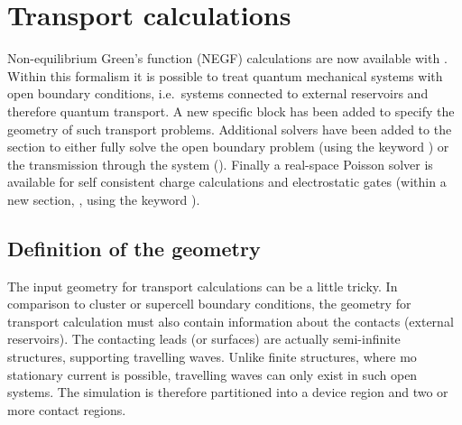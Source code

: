 \chapter{Transport calculations}
\label{app:transp}

Non-equilibrium Green's function (NEGF) calculations are now available with
{\dftbp}. Within this formalism it is possible to treat quantum mechanical
systems with open boundary conditions, i.e.\ systems connected to external
reservoirs and therefore quantum transport.  A new specific 
block has been added to specify the geometry of such transport problems.
Additional solvers have been added to the  section to either
fully solve the open boundary problem (using the keyword )
or the transmission through the system (). Finally a
real-space Poisson solver is available for self consistent charge calculations
and electrostatic gates (within a new section, , using the
keyword ).

\section{Definition of the geometry}
\label{sec:transport.geometry}

The input geometry for transport calculations can be a little tricky. In
comparison to cluster or supercell boundary conditions, the geometry for
transport calculation must also contain information about the contacts (external
reservoirs). The contacting leads (or surfaces) are actually semi-infinite
structures, supporting travelling waves. Unlike finite structures, where mo
stationary current is possible, travelling waves can only exist in such open
systems.  The simulation is therefore partitioned into a device region and two
or more contact regions.

